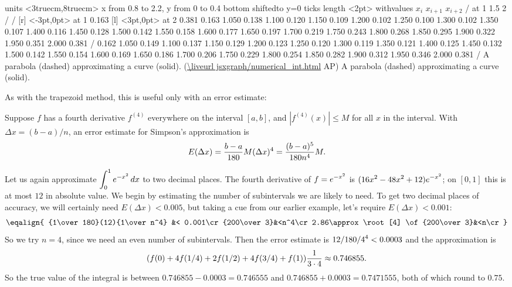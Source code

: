 \figure
\texonly
\vbox{\beginpicture
\normalgraphs
\ninepoint
\setcoordinatesystem units <3truecm,8truecm>
\setplotarea x from 0.8 to 2.2, y from 0 to 0.4
\axis bottom shiftedto y=0 ticks length <2pt> 
  withvalues {$x_i$} {$x_{i+1}$} {$x_{i+2}$} / at 1 1.5 2 / /
 [r] <-3pt,0pt> at 1 0.163
 [l] <3pt,0pt> at 2 0.381
\setquadratic
{} 0.163 1.050 0.138 1.100 0.120 1.150 0.109 1.200 0.102
1.250 0.100 1.300 0.102 1.350 0.107 1.400 0.116 1.450 0.128
1.500 0.142 1.550 0.158 1.600 0.177 1.650 0.197 1.700 0.219
1.750 0.243 1.800 0.268 1.850 0.295 1.900 0.322 1.950 0.351
2.000 0.381 /
\setdashes <2pt>
 0.162 1.050 0.149 1.100 0.137 1.150 0.129 1.200 0.123
1.250 0.120 1.300 0.119 1.350 0.121 1.400 0.125 1.450 0.132
1.500 0.142 1.550 0.154 1.600 0.169 1.650 0.186 1.700 0.206
1.750 0.229 1.800 0.254 1.850 0.282 1.900 0.312 1.950 0.346
2.000 0.381 /
\endpicture}
\begincaption
{A parabola (dashed) approximating a curve (solid).
(\expandafter\url\expandafter{\liveurl jsxgraph/numerical_int.html}%
AP\endurl)}
\endcaption
\endtexonly
{}
\begincaption
A parabola (dashed) approximating a curve (solid).
\endcaption
\endfigure

As with the trapezoid method, this is useful only with an error
estimate:

\thm Suppose $f$ has a fourth derivative $f^{(4)}$ everywhere on the
interval $[a,b]$, and $|f^{(4)}(x)|\le M$ for all $x$ in the
interval. With $\Delta x= (b-a)/n$, an error estimate for Simpson's
approximation is
$$
  E(\Delta x) = {b-a\over180}M(\Delta x)^4={(b-a)^5\over 180n^4}M.
$$
\endthmnoproof

\example Let us again approximate $\displaystyle\int_0^1 e^{-x^2}\,dx$ to two
decimal places.  The fourth derivative of $\displaystyle f=e^{-x^2}$ is
$\displaystyle(16x^2-48x^2+12)e^{-x^2}$; on $[0,1]$ this is at most
$12$ in absolute value.  We begin by estimating the number of
subintervals we are likely to need. To get two decimal places of
accuracy, we will certainly need $E(\Delta x)<0.005$, but taking a cue
from our earlier example, let's require $E(\Delta x)<0.001$:
$$
  \eqalign{
  {1\over180}(12){1\over n^4} &< 0.001\cr
  {200\over3}&<n^4\cr
  2.86\approx\root[4] \of {200\over3}&<n\cr}
$$
So we try $n=4$, since we need an even number of subintervals. Then
the error estimate is $\displaystyle12/180/4^4<0.0003$ and the approximation is
$$
  (f(0)+4f(1/4)+2f(1/2)+4f(3/4)+f(1)){1\over3\cdot4}
  \approx 0.746855.
$$
So the true value of the integral is between $0.746855-0.0003=0.746555$ and
$0.746855+0.0003=0.7471555$, both of which round to $0.75$.
\endexample

